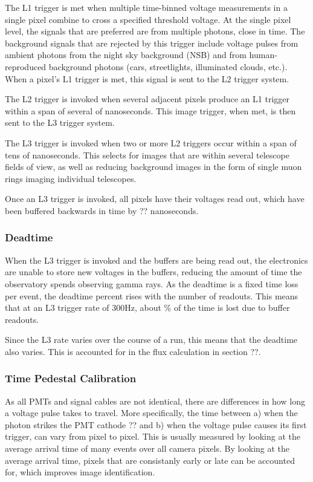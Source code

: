 The L1 trigger is met when multiple time-binned voltage measurements in a single pixel combine to cross a specified threshold voltage.
At the single pixel level, the signals that are preferred are from multiple photons, close in time.
The background signals that are rejected by this trigger include voltage pulses from ambient photons from the night sky background (NSB) and from human-reproduced background photons (cars, streetlights, illuminated clouds, etc.).
When a pixel's L1 trigger is met, this signal is sent to the L2 trigger system.

The L2 trigger is invoked when several adjacent pixels produce an L1 trigger within a span of several of nanoseconds.
This image trigger, when met, is then sent to the L3 trigger system.

The L3 trigger is invoked when two or more L2 triggers occur within a span of tens of nanoseconds.
This selects for images that are within several telescope fields of view, as well as reducing background images in the form of single muon rings imaging individual telescopes.

Once an L3 trigger is invoked, all pixels have their voltages read out, which have been buffered backwards in time by ?? nanoseconds.


\subsubsection{Deadtime}
When the L3 trigger is invoked and the buffers are being read out, the electronics are unable to store new voltages in the buffers, reducing the amount of time the observatory spends observing gamma rays.
As the deadtime is a fixed time loss per event, the deadtime percent rises with the number of readouts.
This means that at an L3 trigger rate of \nicetilde300Hz, about \% of the time is lost due to buffer readouts.

Since the L3 rate varies over the course of a run, this means that the deadtime also varies.
This is accounted for in the flux calculation in section ??.

\subsubsection{Time Pedestal Calibration}
As all PMTs and signal cables are not identical, there are differences in how long a voltage pulse takes to travel.
More specifically, the time between a) when the photon strikes the PMT cathode ?? and b) when the voltage pulse causes its first trigger, can vary from pixel to pixel.
This is usually measured by looking at the average arrival time of many events over all camera pixels.
By looking at the average arrival time, pixels that are consistanly early or late can be accounted for, which improves image identification.

